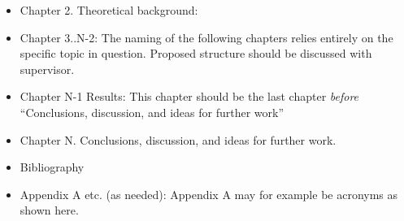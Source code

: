 \begin{itemize}
	\item Chapter 2. Theoretical background: 
	\item Chapter 3..N-2: The naming of the following chapters relies entirely on the specific topic in question. Proposed structure should be discussed with supervisor.
	\item Chapter N-1 Results: This chapter should be the last chapter \textit{before} ``Conclusions, discussion, and ideas for further work''
	\item Chapter N. Conclusions, discussion, and ideas for further work.
	\item Bibliography
	\item Appendix A etc. (as needed): Appendix A may for example be acronyms as shown here.
\end{itemize}

